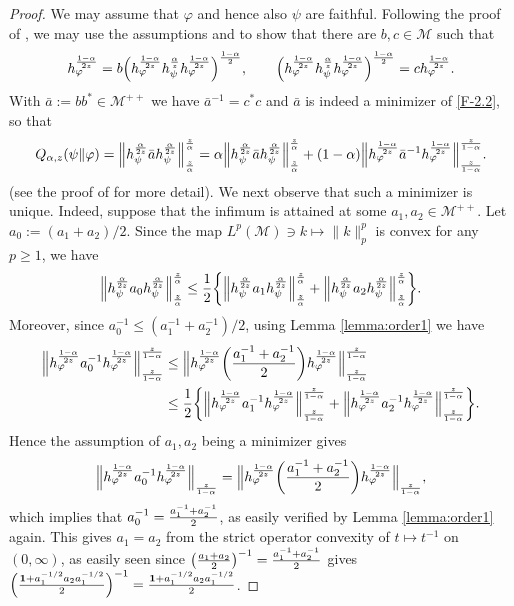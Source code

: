 \documentclass[12pt]{article}
\theoremstyle{definition}
\theoremstyle{remark}
\numberwithin{equation}{section}
\def\cM{\mathcal M}
\def\Me{\mathcal M}
\def\ffi{\varphi}
\def\1{\mathbf{1}}
\begin{document}
\begin{proof} We may assume that $\varphi$ and hence also $\psi$ are faithful. Following
 the proof of \cite[Theorem 1(vi)]{kato2023onrenyi},  we may use the
assumptions and \cite[Lemma A.58]{hiai2021quantum} to show  that there are $b,c\in\cM$ such that
\begin{align}\label{eq:bc}
h_\ffi^{1-\alpha\over2z}
=b\Bigl(h_\ffi^{1-\alpha\over2z}h_\psi^{\alpha\over z}h_\ffi^{1-\alpha\over2z}\Bigr)^{1-\alpha\over2},\qquad
\Bigl(h_\ffi^{1-\alpha\over2z}h_\psi^{\alpha\over z}h_\ffi^{1-\alpha\over2z}\Bigr)^{1-\alpha\over2}
=ch_\ffi^{1-\alpha\over2z}.
\end{align}
With $\bar a:=bb^*\in\cM^{++}$ we have  $\bar a^{-1}=c^*c$ and $\bar a$ is indeed a minimizer of
\eqref{F-2.2}, so that
\begin{align}\label{eq:infimum}
Q_{\alpha,z}(\psi\|\ffi)
=\Big\|h_\psi^{\alpha\over2z}\bar ah_\psi^{\alpha\over2z}\Big\|_{z\over\alpha}^{z\over\alpha}
=\alpha\Big\|h_\psi^{\alpha\over2z}\bar ah_\psi^{\alpha\over2z}\Big\|_{z\over\alpha}^{z\over\alpha}
+(1-\alpha)\Big\|h_\ffi^{1-\alpha\over2z}\bar a^{-1}h_\ffi^{1-\alpha\over2z}\Big\|_{z\over
1-\alpha}^{z\over 1-\alpha}.
\end{align}
(see the proof of \cite[Theorem 1(vi)]{kato2023onrenyi} for more detail).
We next observe that such a minimizer is unique. Indeed, suppose that the infimum is
attained  at some $a_1,a_2\in \Me^{++}$. Let $a_0:=(a_1+a_2)/2$. Since the map 
$L^{p}(\cM)\ni k\mapsto\|k\|_{p}^{p}$ is convex for any $p\ge 1$, we have 
\[
\Big\|h_\psi^{\alpha\over2z}a_0h_\psi^{\alpha\over2z}\Big\|_{z\over\alpha}^{z\over\alpha}
\le{1\over2}\biggl\{\Big\|h_\psi^{\alpha\over2z}a_1
h_\psi^{\alpha\over2z}\Big\|_{z\over\alpha}^{z\over\alpha}
+\Big\|h_\psi^{\alpha\over2z}a_2h_\psi^{\alpha\over2z}\Big\|_{z\over\alpha}^{z\over\alpha}\biggr\}.
\]
Moreover, {since $a_0^{-1}\le(a_1^{-1}+a_2^{-1})/2$}, using Lemma \ref{lemma:order1}
we have
\begin{align*}
\Big\|h_\ffi^{1-\alpha\over2z}a_0^{-1}h_\ffi^{1-\alpha\over2z}\Big\|_{z\over1-\alpha}^{z\over1-\alpha}
&\le\Big\|h_\ffi^{1-\alpha\over2z}\biggl({a_1^{-1}+a_2^{-1}\over2}\biggr)
h_\ffi^{1-\alpha\over2z}\Big\|_{z\over1-\alpha}^{z\over1-\alpha} \\
&\le{1\over2}\biggl\{\Big\|h_\ffi^{1-\alpha\over2z}a_1^{-1}
h_\ffi^{1-\alpha\over2z}\Big\|_{z\over1-\alpha}^{z\over1-\alpha}
+\Big\|h_\ffi^{1-\alpha\over2z}a_2^{-1}
h_\ffi^{1-\alpha\over2z}\Big\|_{z\over1-\alpha}^{z\over1-\alpha}\biggr\}.
\end{align*}
Hence the assumption of $a_1,a_2$ being a minimizer gives
\[
\Big\|h_\ffi^{1-\alpha\over2z}a_0^{-1}h_\ffi^{1-\alpha\over2z}\Big\|_{z\over1-\alpha}
=\Big\|h_\ffi^{1-\alpha\over2z}\biggl({a_1^{-1}+a_2^{-1}\over2}\biggr)
h_\ffi^{1-\alpha\over2z}\Big\|_{z\over1-\alpha},
\]
which implies that $a_0^{-1}={a_1^{-1}+a_2^{-1}\over2}$, as easily verified by Lemma \ref{lemma:order1}
again. {\color{red}This gives $a_1=a_2$ from the strict operator convexity of $t\mapsto t^{-1}$ on
$(0,\infty)$, as easily seen since $\bigl({a_1+a_2\over2}\bigr)^{-1}={a_1^{-1}+a_2^{-1}\over2}$ gives
$\Bigl({\1+a_1^{-1/2}a_2a_1^{-1/2}\over2}\Bigr)^{-1}={\1+a_1^{-1/2}a_2a_1^{-1/2}\over2}$.}


\end{proof}
\end{document}

